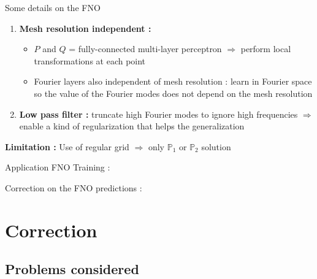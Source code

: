 \documentclass[compress,10pt,xcolor={table,dvipsnames},t]{beamer}
\begin{document}
	\begin{frame}{Some details on the FNO}
		\begin{enumerate}[\ding{217}]
			\item \textbf{Mesh resolution independent : }
			\begin{itemize}
				\item $P$ and $Q$ = fully-connected multi-layer perceptron $\Rightarrow$ perform local transformations at each point
				\item Fourier layers also independent of mesh resolution : learn in Fourier space so the value of the Fourier modes does not depend on the mesh resolution
			\end{itemize}
			\item \textbf{Low pass filter :} truncate high Fourier modes to ignore high frequencies $\Rightarrow$ enable a kind of regularization that helps the generalization
			\begin{center}
			\end{center}
		\end{enumerate}		
		\textbf{Limitation :} Use of regular grid $\Rightarrow$ only $\mathbb{P}_1$ or $\mathbb{P}_2$ solution
	\end{frame}

	\begin{frame}{Application}
		FNO Training :
		\begin{center}
		\end{center}
		Correction on the FNO predictions :
		\begin{center}
		\end{center}
	\end{frame}
	
	\section{Correction}
	
	\subsection{Problems considered}
	
\end{document}
